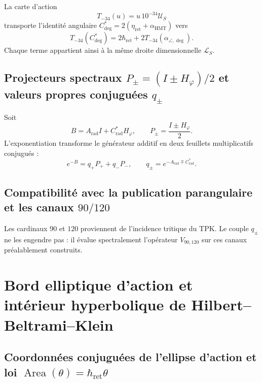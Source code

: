 La carte d'action
\begin{equation}
 T_{-34}(u)=u\,10^{-34}\mathcal U_S
 \label{eq:l9s102:euler-t34}
\end{equation}
transporte l'identité angulaire
\(C^*_{\deg}=2(\eta_{\mathrm{ret}}+\alpha_{\mathrm{HMT}})\) vers
\begin{equation}
 \boxed{
 T_{-34}(C^*_{\deg})
 =2\hbar_{\mathrm{ret}}
 +2T_{-34}(\alpha_{\angle,\deg}).}
 \label{eq:l9s102:euler-cstar-hbar}
\end{equation}
Chaque terme appartient ainsi à la même droite dimensionnelle
\(\mathcal L_S\).

\subsection{Projecteurs spectraux \texorpdfstring{\(P_\pm=(I\pm H_\varphi)/2\)}{P+/-=(I+/-H_phi)/2} et valeurs propres conjuguées \texorpdfstring{\(q_\pm\)}{q+/-}}

Soit
\begin{equation}
 B=A_{\mathrm{rad}}I+C^*_{\mathrm{rad}}H_\varphi,
 \qquad
 P_\pm=\frac{I\pm H_\varphi}{2}.
 \label{eq:l9s102:euler-b}
\end{equation}
L'exponentiation transforme le générateur additif en deux feuillets
multiplicatifs conjugués :
\begin{equation}
 \boxed{
 e^{-B}=q_+P_++q_-P_-,
 \qquad
 q_\pm=e^{-A_{\mathrm{rad}}\mp C^*_{\mathrm{rad}}}.}
 \label{eq:l9s102:euler-exp-b}
\end{equation}

\subsection{Compatibilité avec la publication parangulaire et les canaux \texorpdfstring{\(90/120\)}{90/120}}

Les cardinaux \(90\) et \(120\) proviennent de l'incidence tritique du TPK.
Le couple \(q_\pm\) ne les engendre pas : il évalue spectralement l'opérateur
\(V_{90,120}\) sur ces canaux préalablement construits.

\section{Bord elliptique d'action et intérieur hyperbolique de Hilbert--Beltrami--Klein}
\label{sec:l9s102:euler-elipse-klein}

\subsection{Coordonnées conjuguées de l'ellipse d'action et loi \texorpdfstring{\(\operatorname{Area}(\theta)=\hbar_{\mathrm{ret}}\theta\)}{Area(theta)=hbar_ret theta}}

